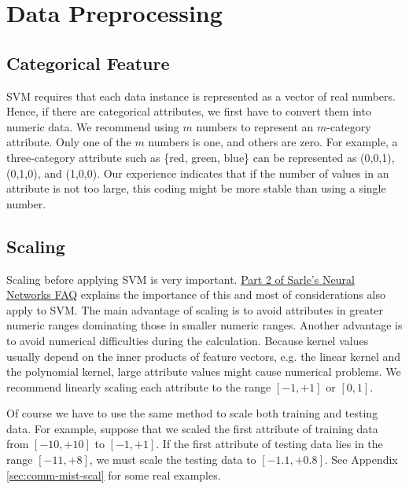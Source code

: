 \documentclass[12pt]{article}
\begin{document}

\section{Data Preprocessing}

\subsection{Categorical Feature}

SVM requires that each data instance is represented as a vector of
real numbers. Hence, if there are categorical attributes, we first
have to convert them into numeric data. We recommend using $m$ numbers
to represent an $m$-category attribute. Only one of the $m$ numbers is
one, and others are zero. For example, a three-category attribute such
as \{red, green, blue\} can be represented as (0,0,1), (0,1,0), and
(1,0,0). Our experience indicates that if the number of values in an
attribute is not too large, this coding might be more stable than
using a single number. 

\subsection{Scaling}
\label{scaling}

Scaling before applying SVM is very
important. \href{http://www.faqs.org/faqs/ai-faq/neural-nets} {Part 2 of
  Sarle's Neural Networks FAQ} \cite{NN01a} explains the importance of
this and most of considerations also apply to SVM. The main advantage
of scaling is to avoid attributes in greater numeric ranges dominating
those in smaller numeric ranges. Another advantage is to avoid
numerical difficulties during the calculation.  Because kernel values
usually depend on the inner products of feature vectors, e.g. the
linear kernel and the polynomial kernel, large attribute values might
cause numerical problems.  We recommend linearly scaling each
attribute to the range $[-1,+1]$ or $[0,1]$.

Of course we have to use the same method to scale both training and
testing data. For example, suppose that we scaled the first attribute
of training data from $[-10, +10]$ to $[-1, +1]$.  If the first
attribute of testing data lies in the range $[-11, +8]$, we must
scale the testing data to $[-1.1, +0.8]$.
See Appendix \ref{sec:comm-mist-scal} for
some real examples.
\end{document}

